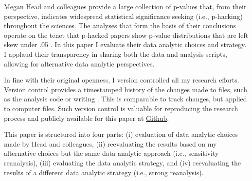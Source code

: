 Megan Head and colleagues provide a large collection of p-values that, from their perspective, indicates widespread statistical significance seeking (i.e., p-hacking) throughout the sciences. The analyses that form the basis of their conclusions operate on the tenet that p-hacked papers show p-value distributions that are left skew under .05 \cite{Simonsohn2014}. In this paper I evaluate their data analytic choices and strategy. I applaud their transparency in sharing both the data and analysis scripts, allowing for alternative data analytic perspectives.

In line with their original openness, I version controlled all my research efforts. Version control provides a timestamped history of the changes made to files, such as the analysis code or writing \cite{Ram2013}. This is comparable to track changes, but applied to computer files. Such version control is valuable for reproducing the research process and publicly available for this paper at \href{https://github.com/chartgerink/2015head}{Github}.

This paper is structured into four parts: (i) evaluation of data analytic choices made by Head and colleagues, (ii) reevaluating the results based on my alternative choices but the same data analytic approach (i.e., sensitivity reanalysis), (iii) evaluating the data analytic strategy, and (iv) reevaluating the results of a different data analytic strategy (i.e., strong reanalysis). 